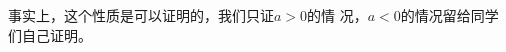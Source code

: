事实上，这个性质是可以证明的，我们只证$a>0$的情
况，$a<0$的情况留给同学们自己证明。









\begin{example}
    
\end{example}

\begin{example}
    
\end{example}



\begin{solution}
    
\end{solution}

\begin{solution}
    
\end{solution}


\begin{solution}
    
\end{solution}

\begin{solution}
    
\end{solution}


\begin{example}
    
\end{example}

\begin{solution}
    
\end{solution}

\begin{solution}
    
\end{solution}


\begin{example}
    
\end{example}

\begin{example}
    
\end{example}

\begin{example}
    
\end{example}




















\begin{example}
    
\end{example}

